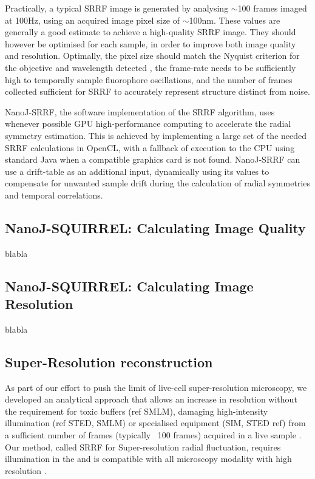  Practically, a typical SRRF image is generated by analysing $\sim$100 frames imaged at 100Hz, using an acquired image pixel size of $\sim$100nm. These values are generally a good estimate to achieve a high-quality SRRF image. They should however be optimised for each sample, in order to improve both image quality and resolution. Optimally, the pixel size should match the Nyquist criterion for the objective and wavelength detected \cite{pawley2010handbook}, the frame-rate needs to be sufficiently high to temporally sample fluorophore oscillations, and the number of frames collected sufficient for SRRF to accurately represent structure distinct from noise. 
 
 NanoJ-SRRF, the software implementation of the SRRF algorithm, uses whenever possible GPU high-performance computing to accelerate the radial symmetry estimation. This is achieved by implementing a large set of the needed SRRF calculations in OpenCL, with a fallback of execution to the CPU using standard Java when a compatible graphics card is not found. NanoJ-SRRF can use a drift-table as an additional input, dynamically using its values to compensate for unwanted sample drift during the calculation of radial symmetries and temporal correlations.

\subsection*{NanoJ-SQUIRREL: Calculating Image Quality}

blabla

\subsection*{NanoJ-SQUIRREL: Calculating Image Resolution}

blabla

\subsection*{Super-Resolution reconstruction}
As part of our effort to push the limit of live-cell super-resolution microscopy, we developed an analytical approach that allows an increase in resolution without the requirement for toxic buffers  (ref SMLM), damaging high-intensity illumination (ref STED, SMLM) or specialised equipment (SIM, STED ref) from a sufficient number of frames (typically ~100 frames) acquired in a live sample \cite{gustafsson2016fast}. Our method, called SRRF for Super-resolution radial fluctuation, requires  illumination in the and is compatible with all microscopy modality with high resolution \cite{culley2018srrf}. 


